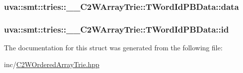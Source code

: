 \subsubsection[{data}]{ uva\+::smt\+::tries\+::\+\_\+\+\_\+\+C2\+W\+Array\+Trie\+::\+T\+Word\+Id\+P\+B\+Data\+::data}\label{structuva_1_1smt_1_1tries_1_1_____c2_w_array_trie_1_1_t_word_id_p_b_data_a2c33cf0434b38201eb14a595de99d9a1}
\hypertarget{structuva_1_1smt_1_1tries_1_1_____c2_w_array_trie_1_1_t_word_id_p_b_data_a9ce49ee80d214c454766b205990e1c77}{}
\subsubsection[{id}]{ uva\+::smt\+::tries\+::\+\_\+\+\_\+\+C2\+W\+Array\+Trie\+::\+T\+Word\+Id\+P\+B\+Data\+::id}\label{structuva_1_1smt_1_1tries_1_1_____c2_w_array_trie_1_1_t_word_id_p_b_data_a9ce49ee80d214c454766b205990e1c77}


The documentation for this struct was generated from the following file\+:\begin{DoxyCompactItemize}
\item 
inc/\hyperlink{_c2_w_ordered_array_trie_8hpp}{C2\+W\+Ordered\+Array\+Trie.\+hpp}\end{DoxyCompactItemize}
